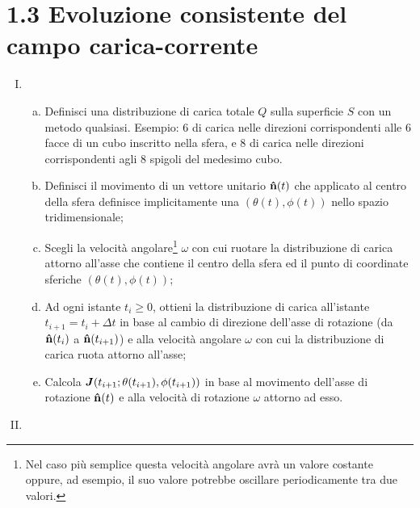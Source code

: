 \section*{1.3 Evoluzione consistente del campo carica-corrente}\label{sec_1.3}
\begin{enumerate}[(I)]
\item {}  
	\begin{enumerate}[(a)]
	\item Definisci una distribuzione di carica totale $Q$ sulla superficie $S$ con un metodo qualsiasi. Esempio: 6  di carica  nelle direzioni corrispondenti alle 6 facce di un cubo inscritto nella sfera, e 8  di carica  nelle direzioni corrispondenti agli 8 spigoli del medesimo cubo.  
	\item Definisci il movimento di un vettore unitario $\vu{n}(t)$ che applicato al centro della sfera definisce implicitamente una  $(\theta(t), \phi(t))$ nello spazio tridimensionale; 
	\item Scegli la velocità angolare\footnote{Nel caso più semplice questa velocità angolare avrà un valore costante oppure, ad esempio, il suo valore potrebbe oscillare periodicamente tra due valori.} $\omega$ con cui ruotare la distribuzione di carica attorno all'asse che contiene il centro della sfera ed il punto di coordinate sferiche 
$(\theta(t), \phi(t))$;
	\item Ad ogni istante $t_i \geq 0$, ottieni la distribuzione di carica all'istante $t_{i+1} = t_i + \Delta t$ in base al cambio di direzione dell'asse di rotazione (da $\vu{n}(t_i)$ a $\vu{n}(t_{i+1})$) e alla velocità angolare $\omega$ con cui la distribuzione di carica ruota attorno all'asse;
	\item Calcola $\vb*{J}(t_{i+1}; \theta(t_{i+1}), \phi(t_{i+1}) )$  in base al movimento dell'asse di rotazione $\vu{n}(t)$ e alla velocità di rotazione $\omega$ attorno ad esso.
	\end{enumerate}
\item {} 
	\begin{enumerate}[(a)]

\end{enumerate}
\end{enumerate}
